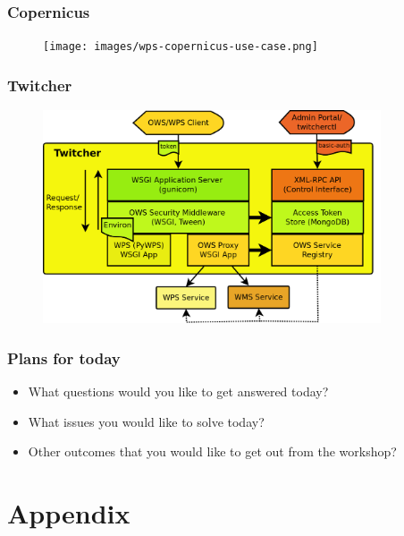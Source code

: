 \documentclass{beamer}
\begin{document}

  \begin{frame}
    \frametitle{Copernicus}
    \begin{figure}
      \texttt{[image: images/wps-copernicus-use-case.png]}
    \end{figure}
  \end{frame}


  \begin{frame}
    \frametitle{Twitcher}
    \begin{figure}
      \includegraphics[width=10cm]{images/twitcher-overview.png}
    \end{figure}
  \end{frame}


   \begin{frame}
    \frametitle{Plans for today}
    \begin{itemize}
      \item What questions would you like to get answered today?
      \item What issues you would like to solve today?
      \item Other outcomes that you would like to get out from the workshop? 
    \end{itemize}
  \end{frame}


  \appendix

  \section{Appendix}
  
\end{document}
